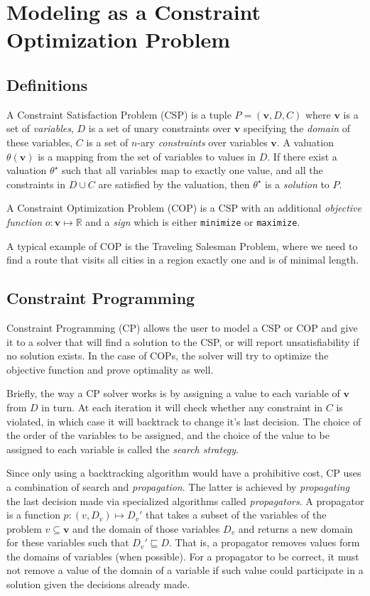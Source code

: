 \documentclass[letterpaper]{article} %
\begin{document}
\section{Modeling as a Constraint Optimization Problem \label{SEC:CP}}

\subsection{Definitions}
A Constraint Satisfaction Problem (CSP) is a tuple $P = (\boldsymbol{v},D,C)$ 
where $\boldsymbol{v}$ is a 
set of \emph{variables}, $D$ is a set of unary constraints over 
$\boldsymbol{v}$ specifying 
the \emph{domain} of these variables, $C$ is a set of $n$-ary 
\emph{constraints} over variables $\boldsymbol{v}$.
A valuation $\theta(\boldsymbol{v})$ is a mapping from the set of variables to 
values in $D$. 
If there exist a valuation $\theta^\star$ such that all 
variables map 
to exactly one value, and all the constraints in $D\cup C$ are satisfied by the 
valuation, then $\theta^\star$ is a \emph{solution} to $P$.

A Constraint Optimization Problem (COP) is a CSP with an additional 
\emph{objective function} $o : \boldsymbol{v} \mapsto \mathbb{R}$ and a 
\emph{sign} which is either \verb|minimize| or \verb|maximize|. 

A typical example of COP is the Traveling Salesman Problem, where we need to 
find a route that visits all cities in a region exactly one and is of minimal 
length.

\subsection{Constraint Programming}
Constraint Programming (CP) allows the user to model a CSP or COP and give it 
to a 
solver that will find a solution to the CSP, or will report unsatisfiability if 
no solution exists. In the case of COPs, the solver will try to optimize 
the objective function and prove optimality as well.

Briefly, the way a CP solver works is by assigning a value to each variable of 
$\boldsymbol{v}$ from $D$ in turn. At each iteration it will check whether any 
constraint in $C$ is violated, in which case it will backtrack to change it's 
last decision. The choice of the order of the variables to be assigned, and the 
choice of the value to be assigned to each variable is called the \emph{search 
strategy}.

Since only using a backtracking algorithm would have a prohibitive cost, CP 
uses a combination of search and \emph{propagation}. The latter is achieved by 
\emph{propagating} the last decision made via specialized algorithms called 
\emph{propagators}. A propagator is a function $p : (v, D_v) \mapsto D_v'$ that 
takes a subset of the variables of the problem $v \subseteq \boldsymbol{v}$ and 
the domain of those variables $D_v$ and returns a new domain for these 
variables 
such that $D_v' \sqsubseteq D$. That is, a propagator removes values form the 
domains of variables (when possible). For a propagator to be correct, it must 
not remove a value of the domain of a variable if such value could participate 
in a solution given the decisions already made.
\end{document}
